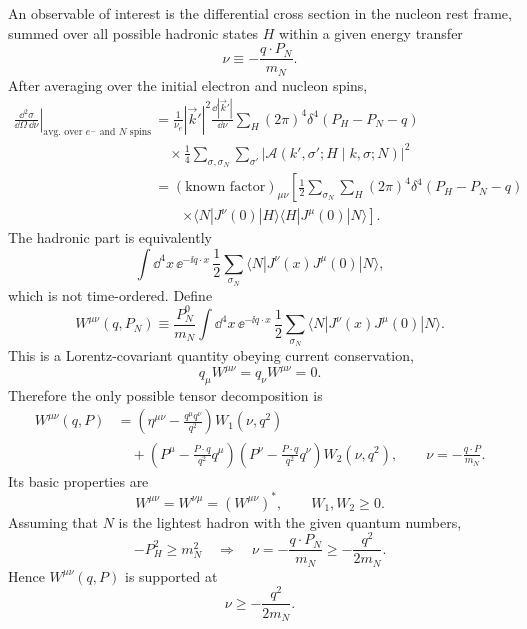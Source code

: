 An observable of interest is the differential cross section in the
nucleon rest frame, summed over all possible hadronic states \(H\) within
a given energy transfer
\[
  \nu\equiv-\frac{q\cdot P_N}{m_N}.
\]
After averaging over the initial electron and nucleon spins,
\[
\begin{aligned}
  \left.
  \frac{\dd^2\sigma}{\dd\Omega\,\dd\nu}
  \right|_{\text{avg. over }e^-\text{ and }N\text{ spins}}
  &=
  \frac1{\nu_e}|\vec k'|^2
  \frac{\dd|\vec k'|}{\dd\nu}
  \sum_H (2\pi)^4\delta^4(P_H-P_N-q)
\\
  &\quad\times
  \frac14
  \sum_{\sigma,\sigma_N}\sum_{\sigma'}
  \left|
    \mathcal A(k',\sigma';H\mid k,\sigma;N)
  \right|^2
\\
  &=
  (\text{known factor})_{\mu\nu}
  \left[
  \frac12\sum_{\sigma_N}\sum_H
  (2\pi)^4\delta^4(P_H-P_N-q)
\right.
\\
  &\qquad\left.
  \times
  \langle N|J^\nu(0)|H\rangle
  \langle H|J^\mu(0)|N\rangle
  \right].
\end{aligned}
\]
The hadronic part is equivalently
\[
  \int\dd^4x\,\ee^{-\ii q\cdot x}\,
  \frac12\sum_{\sigma_N}
  \langle N|J^\nu(x)J^\mu(0)|N\rangle ,
\]
which is not time-ordered.  Define
\[
  W^{\mu\nu}(q,P_N)
  \equiv
  \frac{P_N^0}{m_N}
  \int\dd^4x\,\ee^{-\ii q\cdot x}\,
  \frac12\sum_{\sigma_N}
  \langle N|J^\nu(x)J^\mu(0)|N\rangle .
\]
This is a Lorentz-covariant quantity obeying current conservation,
\[
  q_\mu W^{\mu\nu}=q_\nu W^{\mu\nu}=0.
\]
Therefore the only possible tensor decomposition is
\[
\begin{aligned}
  W^{\mu\nu}(q,P)
  &=
  \left(\eta^{\mu\nu}-\frac{q^\mu q^\nu}{q^2}\right)
  W_1(\nu,q^2)
\\
  &\quad+
  \left(P^\mu-\frac{P\cdot q}{q^2}q^\mu\right)
  \left(P^\nu-\frac{P\cdot q}{q^2}q^\nu\right)
  W_2(\nu,q^2),
  \qquad
  \nu=-\frac{q\cdot P}{m_N}.
\end{aligned}
\]
Its basic properties are
\[
  W^{\mu\nu}=W^{\nu\mu}=(W^{\mu\nu})^*,
  \qquad
  W_1,W_2\ge0.
\]
Assuming that \(N\) is the lightest hadron with the given quantum
numbers,
\[
  -P_H^2\ge m_N^2
  \quad\Longrightarrow\quad
  \nu=-\frac{q\cdot P_N}{m_N}\ge -\frac{q^2}{2m_N}.
\]
Hence \(W^{\mu\nu}(q,P)\) is supported at
\[
  \nu\ge-\frac{q^2}{2m_N}.
\]

